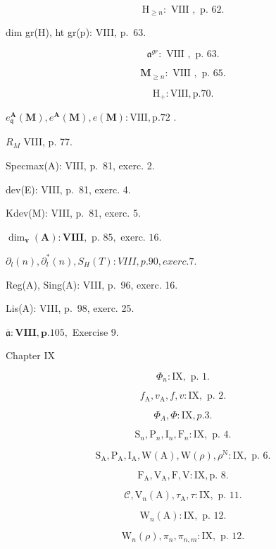 \[
\mathrm{H} _ {\geqslant n}: \text { VIII }, \text { p. } 62.
\]

dim gr(H), ht gr(p): VIII, p.~63.

\[
\mathfrak {a} ^ {g r}: \text { VIII }, \text { p. } 63.
\]

\[
\mathbf {M} _ {\geqslant n}: \text { VIII }, \text { p. } 65.
\]

\[
\mathrm{H} _ {+}: \text {VIII}, \text {p.} 70.
\]

\(e_{\mathfrak{q}}^{\mathbf{A}}(\mathbf{M}), e^{\mathbf{A}}(\mathbf{M}), e(\mathbf{M}) : \mathrm{VIII}, \mathrm{p.72}\) .

\(R_{M}\) VIII, p. 77.

Specmax(A): VIII, p.~81, exerc. 2.

dev(E): VIII, p.~81, exerc. 4.

Kdev(M): VIII, p.~81, exerc. 5.

\(\dim_{\mathbf{v}}(\mathbf{A}) : \mathbf{VIII}, \text{ p. } 85, \text{ exerc. } 16.\)

\(\partial_l(n), \partial_l^*(n), S_H(T): VIII, p. 90, exerc. 7.\)

Reg(A), Sing(A): VIII, p.~96, exerc. 16.

Lis(A): VIII, p.~98, exerc. 25.

\(\overline{\mathfrak{a}}:\mathbf{V}\mathbf{I}\mathbf{I}\mathbf{I}\mathbf{,}\mathbf{p.}105,\) Exercise 9.

Chapter IX

\[
\Phi_ {n}: \mathrm{IX}, \text { p. } 1.
\]

\[
f _ {\mathrm{A}}, v _ {\mathrm{A}}, f, v: \mathrm{IX}, \text { p. } 2.
\]

\[
\Phi_ {A}, \Phi : \mathrm{IX}, p. 3.
\]

\[
\mathrm{S} _ {n}, \mathrm{P} _ {n}, \mathrm{I} _ {n}, \mathrm{F} _ {n}: \mathrm{IX}, \text { p. } 4.
\]

\[
\mathrm{S} _ {\mathrm{A}}, \mathrm{P} _ {\mathrm{A}}, \mathrm{I} _ {\mathrm{A}}, \mathrm{W} (\mathrm{A}), \mathrm{W} (\rho), \rho^ {\mathrm{N}}: \mathrm{IX}, \text { p. } 6.
\]

\[
\mathrm{F} _ {\mathrm{A}}, \mathrm{V} _ {\mathrm{A}}, \mathrm{F}, \mathrm{V}: \mathrm{IX}, \text {p. 8.}
\]

\[
\mathcal {C}, \mathrm{V} _ {n} (\mathrm{A}), \tau_ {\mathrm{A}}, \tau : \mathrm{IX}, \text { p. } 11.
\]

\[
\mathrm{W} _ {n} (\mathrm{A}): \mathrm{IX}, \text { p. } 12.
\]

\[
\mathrm{W} _ {n} (\rho), \pi_ {n}, \pi_ {n, m}: \mathrm{IX}, \text { p. } 12.
\]


